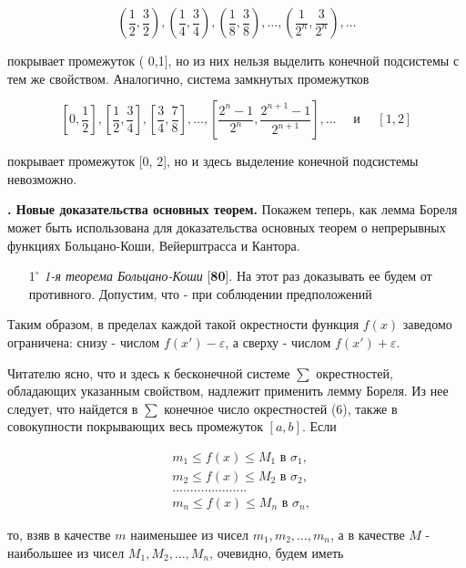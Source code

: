 \documentclass[10pt, twoside]{article}
\newcounter{subtopic}
\newcommand{\subtopic}[1]{%
  \stepcounter{subtopic}%
  \gdef\thesubtopic{\arabic{subtopic}}
  \textbf{\arabic{subtopic}. #1}
}
\begin{document}
$$
  \left(\frac{1}{2}, \frac{3}{2}\right),\left(\frac{1}{4}, \frac{3}{4}\right),\left(\frac{1}{8}, \frac{3}{8}\right), \ldots,\left(\frac{1}{2^{n}}, \frac{3}{2^{n}}\right), \ldots
$$

покрывает промежуток ( 0,1$]$, но из них нельзя выделить конечной подсистемы с тем же свойством. Аналогично, система замкнутых промежутков

$$
  \left[0, \frac{1}{2}\right],\left[\frac{1}{2}, \frac{3}{4}\right],\left[\frac{3}{4}, \frac{7}{8}\right], \ldots,\left[\frac{2^{n}-1}{2^{n}}, \frac{2^{n+1}-1}{2^{n+1}}\right], \ldots \quad \text { и } \quad[1,2]
$$

покрывает промежуток [0, 2], но и здесь выделение конечной подсистемы невозможно.

\subtopic{Новые доказательства основных теорем.} Покажем теперь, как лемма Бореля может быть использована для доказательства основных теорем о непрерывных функциях Больцано-Коши, Вейерштрасса и Кантора.

\begin{enumerate}
  \item[$1^{\circ}$] \textit{1-я теорема Больцано-Коши} [\textbf{80}]. На этот раз доказывать ее будем от противного. Допустим, что - при соблюдении предположений
\end{enumerate}

\newpage
\setcounter{page}{184}
\setcounter{subtopic}{89}

Таким образом, в пределах каждой такой окрестности функция $f(x)$ заведомо ограничена: снизу - числом $f\left(x'\right)-\varepsilon$, а сверху - числом $f\left(x'\right)+\varepsilon$.

Читателю ясно, что и здесь к бесконечной системе $\sum$ окрестностей, обладающих указанным свойством, надлежит применить лемму Бореля. Из нее следует, что найдется в $\sum$ конечное число окрестностей (6), также в совокупности покрывающих весь промежуток $[a, b]$. Если

$$
  \begin{aligned}
     & m_{1} \leqslant f(x) \leqslant M_{1} \text { в } \sigma_{1}, \\
     & m_{2} \leqslant f(x) \leqslant M_{2} \text { в } \sigma_{2}, \\
     & \ldots \ldots \ldots \ldots \ldots \ldots \ldots             \\
     & m_{n} \leqslant f(x) \leqslant M_{n} \text { в } \sigma_{n},
  \end{aligned}
$$

то, взяв в качестве $m$ наименьшее из чисел $m_{1}, m_{2}, \ldots, m_{n}$, а в качестве $M$ - наибольшее из чисел $M_{1}, M_{2}, \ldots, M_{n}$, очевидно, будем иметь
\end{document}

